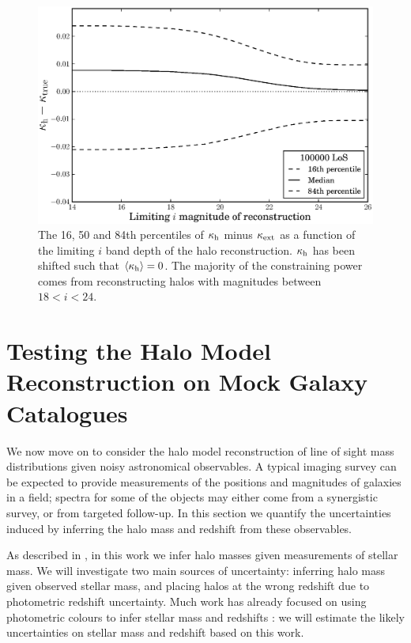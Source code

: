 \documentclass[useAMS,usenatbib,a4paper]{mn2e}
\begin{document}
\begin{figure}
\includegraphics[width=\columnwidth]{figs/mag_scatter.eps}
\caption[magcut]{The 16, 50 and 84th percentiles of $\kappa_{\rm h}$ minus
$\kappa_{\rm ext}$ as a function of the limiting $i$ band depth of the halo
reconstruction. $\kappa_{\rm h}$ has been shifted such that
$\left\langle\kappa_{\rm h}\right\rangle=0$. The majority of the constraining power
comes from reconstructing halos with magnitudes between $18<i<24$.}
\label{fig:magcut}
\end{figure}



\section{Testing the Halo Model Reconstruction on Mock Galaxy Catalogues}
\label{sec:obsMstar+z}

We now move on to consider the halo model reconstruction of line of sight mass
distributions given noisy astronomical observables. A typical imaging survey
can be expected to provide measurements of the positions and magnitudes of
galaxies in a field;  spectra for some of the objects may either come from a
synergistic survey, or from targeted follow-up. In this section we quantify
the uncertainties induced by inferring the halo mass and redshift from these
observables. 

As described in , in this work we infer halo masses
given measurements of stellar mass. We will investigate two main sources of
uncertainty: inferring halo mass given observed stellar mass, and placing halos at
the wrong redshift due to photometric redshift uncertainty. Much work has already
focused on using photometric colours to infer stellar mass
\citep[\eg][]{AugerEtal2009} and redshifts \citep[\eg][]{BPZ}: we will
estimate the likely uncertainties on stellar mass and redshift based on this
work.  
\end{document}
